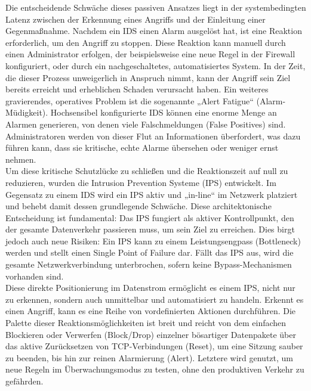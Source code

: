 Die entscheidende Schwäche dieses passiven Ansatzes liegt in der systembedingten Latenz zwischen der Erkennung eines Angriffs und der Einleitung einer Gegenmaßnahme. Nachdem ein IDS einen Alarm ausgelöst hat, ist eine Reaktion erforderlich, um den Angriff zu stoppen. Diese Reaktion kann manuell durch einen Administrator erfolgen, der beispielsweise eine neue Regel in der Firewall konfiguriert, oder durch ein nachgeschaltetes, automatisiertes System. In der Zeit, die dieser Prozess unweigerlich in Anspruch nimmt, kann der Angriff sein Ziel bereits erreicht und erheblichen Schaden verursacht haben. Ein weiteres gravierendes, operatives Problem ist die sogenannte „Alert Fatigue“ (Alarm-Müdigkeit). Hochsensibel konfigurierte IDS können eine enorme Menge an Alarmen generieren, von denen viele Falschmeldungen (False Positives) sind. Administratoren werden von dieser Flut an Informationen überfordert, was dazu führen kann, dass sie kritische, echte Alarme übersehen oder weniger ernst nehmen.\\

Um diese kritische Schutzlücke zu schließen und die Reaktionszeit auf null zu reduzieren, wurden die Intrusion Prevention Systeme (IPS) entwickelt. Im Gegensatz zu einem IDS wird ein IPS aktiv und „in-line“ im Netzwerk platziert und behebt damit dessen grundlegende Schwäche. Diese architektonische Entscheidung ist fundamental: Das IPS fungiert als aktiver Kontrollpunkt, den der gesamte Datenverkehr passieren muss, um sein Ziel zu erreichen. Dies birgt jedoch auch neue Risiken: Ein IPS kann zu einem Leistungsengpass (Bottleneck) werden und stellt einen Single Point of Failure dar. Fällt das IPS aus, wird die gesamte Netzwerkverbindung unterbrochen, sofern keine Bypass-Mechanismen vorhanden sind.\\

Diese direkte Positionierung im Datenstrom ermöglicht es einem IPS, nicht nur zu erkennen, sondern auch unmittelbar und automatisiert zu handeln. Erkennt es einen Angriff, kann es eine Reihe von vordefinierten Aktionen durchführen. Die Palette dieser Reaktionsmöglichkeiten ist breit und reicht von dem einfachen Blockieren oder Verwerfen (Block/Drop) einzelner bösartiger Datenpakete über das aktive Zurücksetzen von TCP-Verbindungen (Reset), um eine Sitzung sauber zu beenden, bis hin zur reinen Alarmierung (Alert). Letztere wird genutzt, um neue Regeln im Überwachungsmodus zu testen, ohne den produktiven Verkehr zu gefährden. \cite{Suricata1, NIST1}\\

